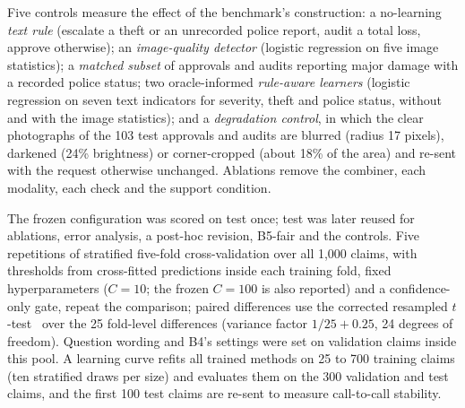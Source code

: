 Five controls measure the effect of the benchmark's construction: a no-learning \emph{text rule} (escalate a theft or an unrecorded police report, audit a total loss, approve otherwise); an \emph{image-quality detector} (logistic regression on five image statistics); a \emph{matched subset} of approvals and audits reporting major damage with a recorded police status; two oracle-informed \emph{rule-aware learners} (logistic regression on seven text indicators for severity, theft and police status, without and with the image statistics); and a \emph{degradation control}, in which the clear photographs of the 103 test approvals and audits are blurred (radius 17 pixels), darkened (24\% brightness) or corner-cropped (about 18\% of the area) and re-sent with the request otherwise unchanged. Ablations remove the combiner, each modality, each check and the support condition.

The frozen configuration was scored on test once; test was later reused for ablations, error analysis, a post-hoc revision, B5-fair and the controls. Five repetitions of stratified five-fold cross-validation over all 1,000 claims, with thresholds from cross-fitted predictions inside each training fold, fixed hyperparameters ($C=10$; the frozen $C=100$ is also reported) and a confidence-only gate, repeat the comparison; paired differences use the corrected resampled $t$-test~\cite{nadeau2003} over the 25 fold-level differences (variance factor $1/25+0.25$, 24 degrees of freedom). Question wording and B4's settings were set on validation claims inside this pool. A learning curve refits all trained methods on 25 to 700 training claims (ten stratified draws per size) and evaluates them on the 300 validation and test claims, and the first 100 test claims are re-sent to measure call-to-call stability.
